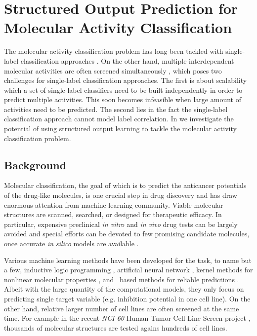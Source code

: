 {\section{Structured Output Prediction for Molecular Activity Classification} \label{sc_su10}

The molecular activity classification problem has long been tackled with single-label classification approaches \citep{Dutt12classification}.
On the other hand, multiple interdependent molecular activities are often screened simultaneously \citep{Shoemaker06the}, which poses two challenges for single-label classification approaches.
The first is about scalability which a set of single-label classifiers need to be built independently in order to predict multiple activities.
This soon becomes infeasible when large amount of activities need to be predicted.
The second lies in the fact the single-label classification approach cannot model label correlation.
In  we investigate the potential of using structured output learning to tackle the molecular activity classification problem.


\subsection{Background}

Molecular classification, the goal of which is to predict the anticancer potentials of the drug-like molecules, is one crucial step in drug discovery and has draw enormous attention from machine learning community.
Viable molecular structures are scanned, searched, or designed for therapeutic efficacy.
In particular, expensive preclinical \textit{in vitro} and \textit{in vivo} drug tests can be largely avoided and special efforts can be devoted to few promising candidate molecules, once accurate \textit{in silico} models are available \citep{Burbidg01drug}.

Various machine learning methods have been developed for the task, to name but a few, inductive logic programming \citep{King96structure}, artificial neural network \citep{Bernazzani06predicting}, kernel methods for nonlinear molecular properties \citep{Trotter01drug,Ralaivola05graph,Swamidass05kernel,Ceroni07classification}, and \svm\ based methods for reliable predictions \citep{Trotter01drug,Byvatov03comparison,Xue04effect}.
Albeit with the large quantity of the computational models, they only focus on predicting single target variable (e.g. inhibition potential in one cell line). 
On the other hand, relative larger number of cell lines are often screened at the same time.
For example in the recent \textit{NCI-60} {Human Tumor Cell Line Screen} project \citep{Shoemaker06the}, thousands of molecular structures are tested agains hundreds of cell lines.


}
